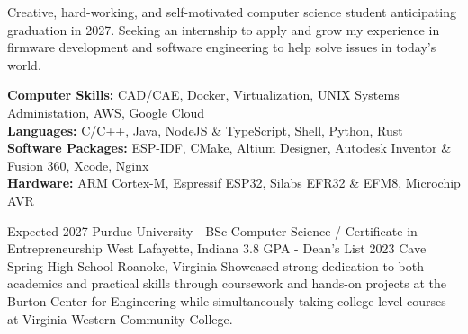 \documentclass[9pt]{developercv} %
\begin{document}
\vspace{0.3cm}



\begin{minipage}[t]{1\textwidth} %
	\vspace{-\baselineskip} %
	Creative, hard-working, and self-motivated computer science student anticipating graduation in 2027. Seeking an internship to apply and grow my experience in firmware development and software engineering to help solve issues in today's world.
\end{minipage}

\vspace{0.3cm}


\begin{minipage}[t]{1\textwidth} %
	\vspace{-\baselineskip} %
	\textbf{Computer Skills:} CAD/CAE, Docker, Virtualization, UNIX Systems Administation, AWS, Google Cloud\\
	\textbf{Languages:} C/C++, Java, NodeJS \& TypeScript, Shell, Python, Rust\\
	\textbf{Software Packages:} ESP-IDF, CMake, Altium Designer, Autodesk Inventor \& Fusion 360, Xcode, Nginx\\
	\textbf{Hardware:} ARM Cortex-M, Espressif ESP32, Silabs EFR32 \& EFM8, Microchip AVR\\
\end{minipage}

\vspace{0.3cm}



\begin{entrylist}
	\entry
		{Expected 2027}
		{Purdue University - BSc Computer Science / Certificate in Entrepreneurship}
		{West Lafayette, Indiana}
		{3.8 GPA - Dean's List}
	\entry
		{2023}
		{Cave Spring High School}
		{Roanoke, Virginia}
		{Showcased strong dedication to both academics and practical skills through coursework and hands-on projects at the Burton Center for Engineering while simultaneously taking college-level courses at Virginia Western Community College.}
\end{entrylist}
\end{document}
